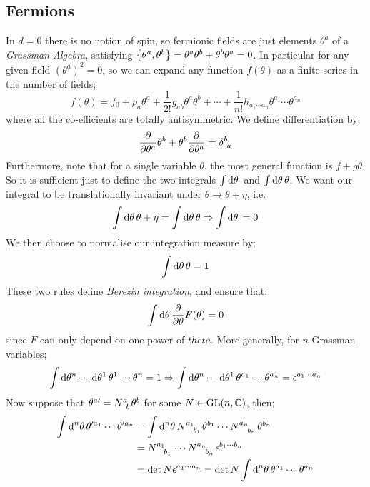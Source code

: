 \subsection{Fermions}
In $d = 0$ there is no notion of spin, so fermionic fields are just elements $\theta^a$ of a \emph{Grassman Algebra}, satisfying $\set{\theta^a, \theta^b} = \theta^a \theta^b + \theta^b \theta^a = 0$. In particular for any given field $(\theta^a)^2 = 0$, so we can expand any function $f(\theta)$ as a finite series in the number of fields;
\begin{equation}
f(\theta) = f_0 + \rho_a\theta^a + \frac{1}{2!}g_{ab}\theta^a\theta^b + \cdots + \frac{1}{n!}h_{a_1 \cdots a_n}\theta^{a_1}\cdots\theta^{a_n}
\end{equation}
where all the co-efficients are totally antisymmetric. We define differentiation by;
\begin{equation}
\frac{\del}{\del \theta^a}\theta^b + \theta^b \frac{\del}{\del \theta^a} = \delta\indices{^{b}_{a}}
\end{equation}
Furthermore, note that for a single variable $\theta$, the most general function is $f + g\theta$. So it is sufficient just to define the two integrals $\int{\text{d}\theta \,}$ and $\int{\text{d}\theta \,\theta}$. We want our integral to be translationally invariant under $\theta \rightarrow \theta + \eta$, i.e.
\begin{equation}
\int{\text{d}\theta \,\theta + \eta} = \int{\text{d}\theta \,\theta} \Rightarrow \int{\text{d}\theta \,} = 0
\end{equation}
We then choose to normalise our integration measure by;
\begin{equation}
\int{\text{d}\theta \,\theta} = 1
\end{equation}
These two rules define \emph{Berezin integration}, and ensure that;
\begin{equation*}
\int{\text{d}\theta \,\frac{\partial}{\partial\theta}F(\theta)} = 0
\end{equation*}
since $F$ can only depend on one power of $theta$. More generally, for $n$ Grassman variables;
\begin{equation*}
\int{\text{d}\theta^n \cdots \text{d}\theta^1 \, \theta^1 \cdots \theta^n} = 1 \Rightarrow \int{\text{d}\theta^n \cdots \text{d}\theta^1 \,\theta^{a_1}\cdots\theta^{a_n}} = \epsilon^{a_1 \cdots a_n}
\end{equation*}
Now suppose that $\theta^{a\prime} = N\indices{^{a}_{b}}\theta^{b}$ for some $N \in \text{GL}(n, \mathbb{C})$, then;
\begin{align*}
\int{\upd{^{n}\theta}\theta^{\prime a_1}\cdots \theta^{\prime a_n}} &= \int{\upd{^n \theta} N\indices{^{a_1}_{b_1}}\theta^{b_1}\cdots N\indices{^{a_n}_{b_n}}\theta^{b_n}} \\
&= N\indices{^{a_1}_{b_1}}\cdots N\indices{^{a_n}_{b_n}}\epsilon^{b_1 \cdots b_n} \\
&= \det N \epsilon^{a_1 \cdots a_n} = \det N \int{\upd{^n \theta} \theta^{a_1}\cdots\theta^{a_n}}
\end{align*} 
